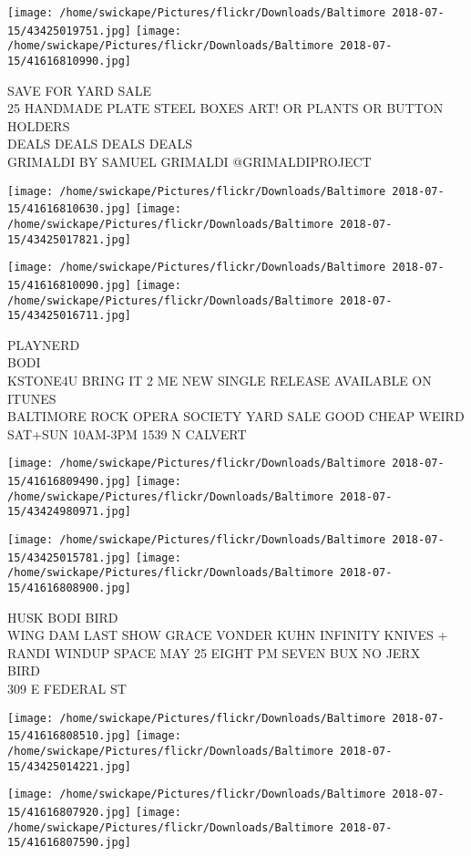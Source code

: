 \documentclass[10pt,letterpaper]{article}
\begin{document}
\texttt{[image: /home/swickape/Pictures/flickr/Downloads/Baltimore 2018-07-15/43425019751.jpg]}
\texttt{[image: /home/swickape/Pictures/flickr/Downloads/Baltimore 2018-07-15/41616810990.jpg]}

SAVE FOR YARD SALE\\
25 HANDMADE PLATE STEEL BOXES ART!  OR PLANTS OR BUTTON HOLDERS\\
DEALS DEALS DEALS DEALS\\
GRIMALDI BY SAMUEL GRIMALDI @GRIMALDIPROJECT
\pagebreak

\texttt{[image: /home/swickape/Pictures/flickr/Downloads/Baltimore 2018-07-15/41616810630.jpg]}
\texttt{[image: /home/swickape/Pictures/flickr/Downloads/Baltimore 2018-07-15/43425017821.jpg]}

\texttt{[image: /home/swickape/Pictures/flickr/Downloads/Baltimore 2018-07-15/41616810090.jpg]}
\texttt{[image: /home/swickape/Pictures/flickr/Downloads/Baltimore 2018-07-15/43425016711.jpg]}

PLAYNERD\\
BODI\\
KSTONE4U BRING IT 2 ME NEW SINGLE RELEASE AVAILABLE ON ITUNES\\
BALTIMORE ROCK OPERA SOCIETY YARD SALE GOOD CHEAP WEIRD SAT+SUN 10AM{-}3PM 1539 N CALVERT
\pagebreak

\texttt{[image: /home/swickape/Pictures/flickr/Downloads/Baltimore 2018-07-15/41616809490.jpg]}
\texttt{[image: /home/swickape/Pictures/flickr/Downloads/Baltimore 2018-07-15/43424980971.jpg]}

\texttt{[image: /home/swickape/Pictures/flickr/Downloads/Baltimore 2018-07-15/43425015781.jpg]}
\texttt{[image: /home/swickape/Pictures/flickr/Downloads/Baltimore 2018-07-15/41616808900.jpg]}

HUSK BODI BIRD\\
WING DAM LAST SHOW GRACE VONDER KUHN INFINITY KNIVES + RANDI WINDUP SPACE MAY 25 EIGHT PM SEVEN BUX NO JERX\\
BIRD\\
309 E FEDERAL ST
\pagebreak

\texttt{[image: /home/swickape/Pictures/flickr/Downloads/Baltimore 2018-07-15/41616808510.jpg]}
\texttt{[image: /home/swickape/Pictures/flickr/Downloads/Baltimore 2018-07-15/43425014221.jpg]}

\texttt{[image: /home/swickape/Pictures/flickr/Downloads/Baltimore 2018-07-15/41616807920.jpg]}
\texttt{[image: /home/swickape/Pictures/flickr/Downloads/Baltimore 2018-07-15/41616807590.jpg]}
\end{document}
